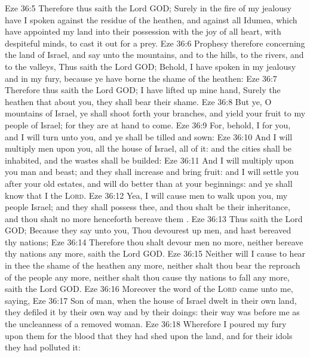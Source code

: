 \vs Eze 36:5 Therefore thus saith the Lord GOD; Surely in the fire of my jealousy have I spoken against the residue of the heathen, and against all Idumea, which have appointed my land into their possession with the joy of all  heart, with despiteful minds, to cast it out for a prey.
\vs Eze 36:6 Prophesy therefore concerning the land of Israel, and say unto the mountains, and to the hills, to the rivers, and to the valleys, Thus saith the Lord GOD; Behold, I have spoken in my jealousy and in my fury, because ye have borne the shame of the heathen:
\vs Eze 36:7 Therefore thus saith the Lord GOD; I have lifted up mine hand, Surely the heathen that  about you, they shall bear their shame.
\vs Eze 36:8 But ye, O mountains of Israel, ye shall shoot forth your branches, and yield your fruit to my people of Israel; for they are at hand to come.
\vs Eze 36:9 For, behold, I  for you, and I will turn unto you, and ye shall be tilled and sown:
\vs Eze 36:10 And I will multiply men upon you, all the house of Israel,  all of it: and the cities shall be inhabited, and the wastes shall be builded:
\vs Eze 36:11 And I will multiply upon you man and beast; and they shall increase and bring fruit: and I will settle you after your old estates, and will do better  than at your beginnings: and ye shall know that I  the \textsc{Lord}.
\vs Eze 36:12 Yea, I will cause men to walk upon you,  my people Israel; and they shall possess thee, and thou shalt be their inheritance, and thou shalt no more henceforth bereave them .
\vs Eze 36:13 Thus saith the Lord GOD; Because they say unto you, Thou  devourest up men, and hast bereaved thy nations;
\vs Eze 36:14 Therefore thou shalt devour men no more, neither bereave thy nations any more, saith the Lord GOD.
\vs Eze 36:15 Neither will I cause  to hear in thee the shame of the heathen any more, neither shalt thou bear the reproach of the people any more, neither shalt thou cause thy nations to fall any more, saith the Lord GOD.
\vs Eze 36:16 Moreover the word of the \textsc{Lord} came unto me, saying,
\vs Eze 36:17 Son of man, when the house of Israel dwelt in their own land, they defiled it by their own way and by their doings: their way was before me as the uncleanness of a removed woman.
\vs Eze 36:18 Wherefore I poured my fury upon them for the blood that they had shed upon the land, and for their idols  they had polluted it:
